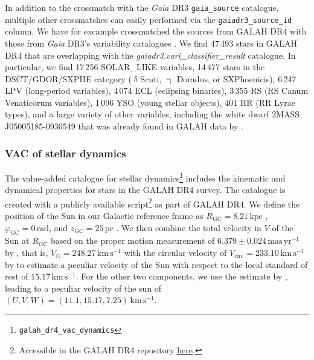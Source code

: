 \documentclass[
  journal=pasa,
  manuscript=research-paper, %
  year=2024,
  volume=37
]{cup-journal}
\newcommand{\Gaia}{\textit{Gaia}\xspace}
\begin{document}
In addition to the crossmatch with the \Gaia DR3 \texttt{gaia\_source} catalogue, multiple other crossmatches can easily performed via the \texttt{gaiadr3\_source\_id} column. We have for excample crossmatched the sources from GALAH DR4 with those from \Gaia DR3's variability catalogues \citep{Rimoldini2023}. We find 47\,493 stars in GALAH DR4 that are overlapping with the \textit{gaiadr3.vari\_classifier\_result} catalogue. In particular, we find 17\,256 SOLAR\_LIKE variables, 14\,477 stars in the DSCT/GDOR/SXPHE category ({$\updelta$}Scuti, {$\upgamma$} Doradus, or SXPhoenicis), 6\,247 LPV (long-period variables), 4\,074 ECL (eclipsing binaries), 3\,355 RS (RS Canum Venaticorum variables), 1\,096 YSO (young stellar objects), 401 RR (RR Lyrae types), and a large variety of other variables, including the white dwarf 2MASS J05005185-0930549 that was already found in GALAH data by \citet{Kawka2020}.

\subsubsection{VAC of stellar dynamics}
\label{sec:vac_dynamics}

The value-added catalogue for stellar dynamics\footnote{\texttt{galah\_dr4\_vac\_dynamics}} includes the kinematic and dynamical properties for stars in the GALAH DR4 survey. The catalogue is created with a publicly available script\footnote{Accessible in the GALAH DR4 repository \href{https://github.com/svenbuder/GALAH_DR4/blob/main/catalogs/create_galah_dr4_vac_dynamics.ipynb}{here}.} as part of GALAH DR4. 
We define the position of the Sun in our Galactic reference frame as $R_\mathrm{GC} = 8.21\,\mathrm{kpc}$ \citep{McMillan2017}, $\varphi_\mathrm{GC} = 0\,\mathrm{rad}$, and $z_\mathrm{GC} = 25\,\mathrm{pc}$ \citep{BlandHawthorn_Gerhard2016}. We then combine the total velocity in $V$ of the Sun at $R_\mathrm{GC}$ based on the proper motion measurement of $6.379\pm0.024\,\mathrm{mas\,yr^{-1}}$ by \citep{Reid2004}, that is, $V_\odot = 248.27\,\mathrm{km\,s^{-1}}$ with the circular velocity of $V_\mathrm{circ} = 233.10\,\mathrm{km\,s^{-1}}$ by \citet{McMillan2017} to estimate a peculiar velocity of the Sun with respect to the local standard of rest of  $15.17\,\mathrm{km\,s^{-1}}$. For the other two components, we use the estimate by \citet{Schoenrich2010}, leading to a peculiar velocity of the sun of $(U,V,W) = (11.1, 15.17, 7.25)\,\mathrm{km\,s^{-1}}$.
\end{document}
